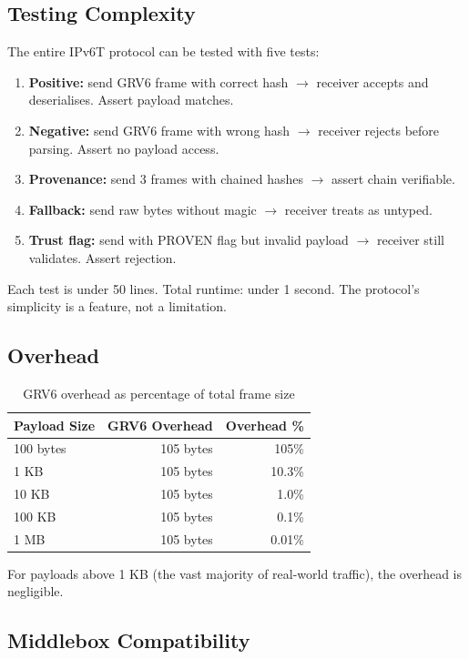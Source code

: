 \documentclass[11pt,a4paper]{article}
\begin{document}
\subsection{Testing Complexity}

The entire IPv6T protocol can be tested with five tests:

\begin{enumerate}
\item \textbf{Positive:} send GRV6 frame with correct hash $\rightarrow$
  receiver accepts and deserialises. Assert payload matches.
\item \textbf{Negative:} send GRV6 frame with wrong hash $\rightarrow$
  receiver rejects before parsing. Assert no payload access.
\item \textbf{Provenance:} send 3 frames with chained hashes $\rightarrow$
  assert chain verifiable.
\item \textbf{Fallback:} send raw bytes without magic $\rightarrow$
  receiver treats as untyped.
\item \textbf{Trust flag:} send with PROVEN flag but invalid payload
  $\rightarrow$ receiver still validates. Assert rejection.
\end{enumerate}

Each test is under 50 lines. Total runtime: under 1 second. The
protocol's simplicity is a feature, not a limitation.

\subsection{Overhead}

\begin{table}[h]
\centering
\begin{tabular}{lrr}
\toprule
Payload Size & GRV6 Overhead & Overhead \% \\
\midrule
100 bytes & 105 bytes & 105\% \\
1 KB & 105 bytes & 10.3\% \\
10 KB & 105 bytes & 1.0\% \\
100 KB & 105 bytes & 0.1\% \\
1 MB & 105 bytes & 0.01\% \\
\bottomrule
\end{tabular}
\caption{GRV6 overhead as percentage of total frame size}
\end{table}

For payloads above 1 KB (the vast majority of real-world traffic), the
overhead is negligible.

\subsection{Middlebox Compatibility}
\end{document}
